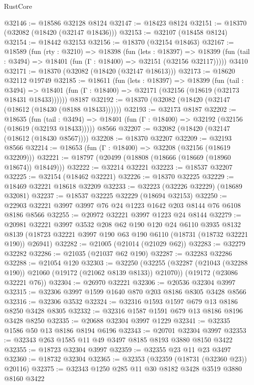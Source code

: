 \begin{lexlean}{RustCore}
\begin{coremodule}
@32146 := @18586 @32128 @8124
@32147 := @18423 @8124
@32151 := @18370 (@32082 (@18420 (@32147 @18436)))
@32153 := @32107 (@18458 @8124)
@32154 := @18442 @32153
@32156 := @18370 (@32154 @18463)
@32167 := @18589
    (fun (rty : @3210) =>
    @18398
      (fun (lets : @18397) =>
      @18399 (fun (tail : @3494) => @18401 (fun (Γ : @18400) => @32151 (@32156 @32117)))))
    @3410
@32171 := @18370 (@32082 (@18420 (@32147 @18613)))
@32173 := @18620 @32112 @19749
@32185 := @18611
    (fun (lets : @18397) =>
    @18399
      (fun (tail : @3494) =>
      @18401 (fun (Γ : @18400) => @32171 (@32156 (@18619 (@32173 @18431 @18433))))))
    @8187
@32192 := @18370 (@32082 (@18420 (@32147 (@18612 (@18430 (@8188 @18433))))))
@32193 := @32173 @8187
@32202 := @18635
    (fun (tail : @3494) => @18401 (fun (Γ : @18400) => @32192 (@32156 (@18619 (@32193 @18433)))))
    @8566
@32207 := @32082 (@18420 (@32147 (@18612 (@18430 @8567))))
@32208 := @18370 @32207
@32209 := @32193 @8566
@32214 := @18653 (fun (Γ : @18400) => @32208 (@32156 (@18619 @32209)))
@32221 := @18797 (@20499 (@18808 (@18666 (@18669 (@18960 @18674)) @18449)))
@32222 := @32214 @32221
@32223 := @18537 @32207
@32225 := @32154 (@18462 @32221)
@32226 := @18370 @32225
@32229 := @18469 @32221 @18618 @32209
@32233 := @32223 (@32226 @32229) (@18689 @32081)
@32237 := @18537 @32225 @32229 (@18694 @32153)
@32250 := @22903 @32221 @3997 @3997 @76 @24 @1223 @1642 @203 @8144 @76 @6108 @8186 @8566
@32255 := @20972 @32221 @3997 @1223 @24 @8144
@32279 := @20981
    @32221
    @3997
    @3532
    @208
    @62
    @190
    @120
    @24
    @6110
    @3935
    @8132
    @8139
    (@18723 @32221 @3997 @190 @63 @190 @6110 (@18731 (@18732 @32221 @190)) @26941)
@32282 := @21005 (@21014 (@21029 @62))
@32283 := @32279 @32282
@32286 := @21035 (@21037 @62 @190)
@32287 := @32283 @32286
@32288 := @21054 @120
@32303 := @32250
    (@32255 (@32287 (@21043 (@32288 @190)) @21060 (@19172 (@21062 @8139 @8133)) @21070))
    (@19172 (@23086 @32221 @76))
@32304 := @26970 @32221
@32306 := @20536 @32304 @3997
@32315 := @32306 @3997 @1599 @1640 @870 @203 @8186 @8305 @3428 @8566
@32316 := @32306 @3532
@32324 := @32316 @1593 @1597 @679 @13 @8186 @8250 @3428 @8305
@32332 := @32316 @1587 @1591 @679 @13 @8186 @8196 @3428 @8250
@32335 := @20688 @32304 @3997 @1229
@32341 := @32335 @1586 @50 @13 @8186 @8194 @6196
@32343 := @20701 @32304 @3997
@32353 := @32343 @263 @1585 @11 @49 @3497 @8185 @8193 @3880 @8150 @3422
@32355 := @18723 @32304 @3997
@32359 := @32355 @23 @11 @23 @3497
@32360 := @18732 @32304
@32365 := @32353 (@32359 (@18731 (@32360 @23)) @20116)
@32375 := @32343 @1250 @285 @11 @30 @8182 @3428 @3519 @3880 @8160 @3422

\end{coremodule}
\end{lexlean}
